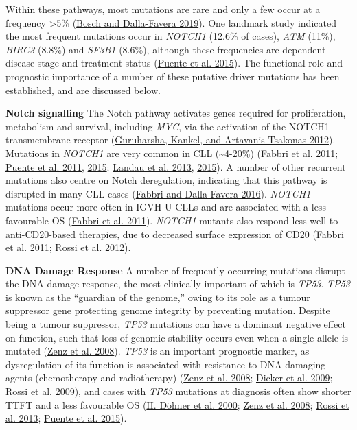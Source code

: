\documentclass[11pt, a4paper, twosided]{book}
\begin{document}
Within these pathways, most mutations are rare and only a few occur at a frequency \textgreater5\% (\protect\hyperlink{ref-Bosch2019}{Bosch and Dalla-Favera 2019}). One landmark study indicated the most frequent mutations occur in \emph{NOTCH1} (12.6\% of cases), \emph{ATM} (11\%), \emph{BIRC3} (8.8\%) and \emph{SF3B1} (8.6\%), although these frequencies are dependent disease stage and treatment status (\protect\hyperlink{ref-Puente2015}{Puente et al. 2015}). The functional role and prognostic importance of a number of these putative driver mutations has been established, and are discussed below.

\textbf{Notch signalling}
The Notch pathway activates genes required for proliferation, metabolism and survival, including \emph{MYC}, via the activation of the NOTCH1 transmembrane receptor (\protect\hyperlink{ref-Guruharsha2012}{Guruharsha, Kankel, and Artavanis-Tsakonas 2012}). Mutations in \emph{NOTCH1} are very common in CLL (\textasciitilde4-20\%) (\protect\hyperlink{ref-Fabbri2011}{Fabbri et al. 2011}; \protect\hyperlink{ref-Puente2011}{Puente et al. 2011}, \protect\hyperlink{ref-Puente2015}{2015}; \protect\hyperlink{ref-Landau2013}{Landau et al. 2013}, \protect\hyperlink{ref-Landau2015}{2015}). A number of other recurrent mutations also centre on Notch deregulation, indicating that this pathway is disrupted in many CLL cases (\protect\hyperlink{ref-Fabbri2016}{Fabbri and Dalla-Favera 2016}). \emph{NOTCH1} mutations occur more often in IGVH-U CLLs and are associated with a less favourable OS (\protect\hyperlink{ref-Fabbri2011}{Fabbri et al. 2011}). \emph{NOTCH1} mutants also respond less-well to anti-CD20-based therapies, due to decreased surface expression of CD20 (\protect\hyperlink{ref-Fabbri2011}{Fabbri et al. 2011}; \protect\hyperlink{ref-Rossi2012}{Rossi et al. 2012}).

\textbf{DNA Damage Response}
A number of frequently occurring mutations disrupt the DNA damage response, the most clinically important of which is \emph{TP53}. \emph{TP53} is known as the ``guardian of the genome,'' owing to its role as a tumour suppressor gene protecting genome integrity by preventing mutation. Despite being a tumour suppressor, \emph{TP53} mutations can have a dominant negative effect on function, such that loss of genomic stability occurs even when a single allele is mutated (\protect\hyperlink{ref-Zenz2008}{Zenz et al. 2008}). \emph{TP53} is an important prognostic marker, as dysregulation of its function is associated with resistance to DNA-damaging agents (chemotherapy and radiotherapy) (\protect\hyperlink{ref-Zenz2008}{Zenz et al. 2008}; \protect\hyperlink{ref-Dicker2009}{Dicker et al. 2009}; \protect\hyperlink{ref-Rossi2009}{Rossi et al. 2009}), and cases with \emph{TP53} mutations at diagnosis often show shorter TTFT and a less favourable OS (\protect\hyperlink{ref-Dohner2000}{H. Döhner et al. 2000}; \protect\hyperlink{ref-Zenz2008}{Zenz et al. 2008}; \protect\hyperlink{ref-Rossi2013}{Rossi et al. 2013}; \protect\hyperlink{ref-Puente2015}{Puente et al. 2015}).
\end{document}
